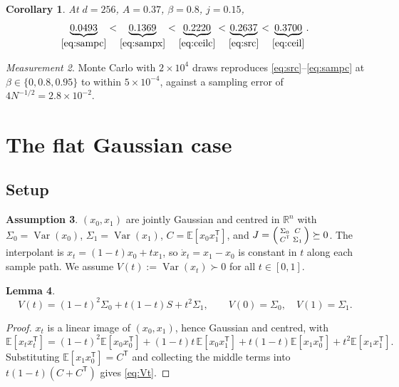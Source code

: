 \documentclass[11pt]{article}
\newtheorem{lemma}{Lemma}[section]
\newtheorem{corollary}[lemma]{Corollary}
\theoremstyle{definition}
\newtheorem{assumption}[lemma]{Assumption}
\theoremstyle{remark}
\newtheorem{measurement}[lemma]{Measurement}
\DeclareMathOperator{\Var}{Var}
\newcommand{\R}{\mathbb{R}}
\newcommand{\E}{\mathbb{E}}
\newcommand{\T}{\mathsf{T}}
\begin{document}
\begin{corollary}\label{cor:order}
At $d=256$, $A=0.37$, $\beta=0.8$, $j=0.15$,
\[
\underbrace{0.0493}_{\eqref{eq:sampc}}<
\underbrace{0.1369}_{\eqref{eq:sampx}}<
\underbrace{0.2220}_{\eqref{eq:ceilc}}<
\underbrace{0.2637}_{\eqref{eq:src}}<
\underbrace{0.3700}_{\eqref{eq:ceil}}.
\]
\end{corollary}

\begin{measurement}\label{meas:ref}
Monte Carlo with $2\times10^{4}$ draws reproduces \eqref{eq:src}--\eqref{eq:sampc} at
$\beta\in\{0,0.8,0.95\}$ to within $5\times10^{-4}$, against a sampling error of
$4N^{-1/2}=2.8\times10^{-2}$.
\end{measurement}

\section{The flat Gaussian case}\label{sec:flat}

\subsection{Setup}

\begin{assumption}\label{ass:flat}
$(x_0,x_1)$ are jointly Gaussian and centred in $\R^{n}$ with
$\Sigma_0=\Var(x_0)$, $\Sigma_1=\Var(x_1)$, $C=\E[x_0x_1^{\T}]$, and
$J=\begin{psmallmatrix}\Sigma_0&C\\C^{\T}&\Sigma_1\end{psmallmatrix}\succeq0$. The interpolant is
$x_t=(1-t)x_0+tx_1$, so $\dot x_t=x_1-x_0$ is constant in $t$ along each sample path. We assume
$V(t):=\Var(x_t)\succ0$ for all $t\in[0,1]$.
\end{assumption}

\begin{lemma}\label{lem:Vt}
\begin{equation}\label{eq:Vt}
V(t)=(1-t)^{2}\Sigma_0+t(1-t)S+t^{2}\Sigma_1,
\qquad
V(0)=\Sigma_0,\quad V(1)=\Sigma_1.
\end{equation}
\end{lemma}

\begin{proof}
$x_t$ is a linear image of $(x_0,x_1)$, hence Gaussian and centred, with
\[
\E[x_tx_t^{\T}]=(1-t)^{2}\E[x_0x_0^{\T}]+(1-t)t\,\E[x_0x_1^{\T}]+t(1-t)\E[x_1x_0^{\T}]+t^{2}\E[x_1x_1^{\T}].
\]
Substituting $\E[x_1x_0^{\T}]=C^{\T}$ and collecting the middle terms into $t(1-t)(C+C^{\T})$ gives
\eqref{eq:Vt}.
\end{proof}
\end{document}

